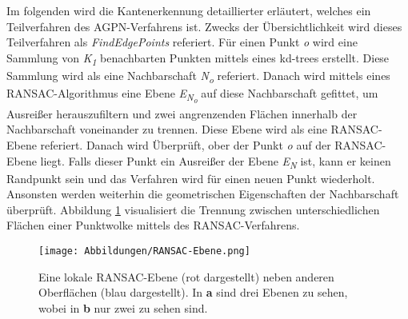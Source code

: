 Im folgenden wird die Kantenerkennung detaillierter erläutert, welches ein Teilverfahren des AGPN-Verfahrens ist. Zwecks der Übersichtlichkeit wird dieses Teilverfahren als \textit{FindEdgePoints} referiert. Für einen Punkt \textit{o} wird eine Sammlung von \textit{K\textsubscript{1}} benachbarten Punkten mittels eines kd-trees erstellt. Diese Sammlung wird als eine Nachbarschaft \textit{N\textsubscript{o}} referiert. Danach wird mittels eines RANSAC-Algorithmus eine Ebene \textit{E\textsubscript{N\textsubscript{o}}} auf diese Nachbarschaft gefittet, um Ausreißer herauszufiltern und zwei angrenzenden Flächen innerhalb der Nachbarschaft voneinander zu trennen. Diese Ebene wird als eine RANSAC-Ebene referiert. Danach wird Überprüft, ober der Punkt \textit{o} auf der RANSAC-Ebene liegt. Falls dieser Punkt ein Ausreißer der Ebene \textit{E\textsubscript{N}} ist, kann er keinen Randpunkt sein und das Verfahren wird für einen neuen Punkt wiederholt. Ansonsten werden weiterhin die geometrischen Eigenschaften der Nachbarschaft überprüft. Abbildung \ref{RANSAC-Ebene} visualisiert die Trennung zwischen unterschiedlichen Flächen einer Punktwolke mittels des RANSAC-Verfahrens. 

\begin{figure}[h]
	\texttt{[image: Abbildungen/RANSAC-Ebene.png]}
	\centering
	\caption{Eine lokale RANSAC-Ebene (rot dargestellt) neben anderen Oberflächen (blau dargestellt). In \textbf{a} sind drei Ebenen zu sehen, wobei in \textbf{b} nur zwei zu sehen sind. \autocite{ni_edge_2016}}
	\label{RANSAC-Ebene}
\end{figure} 

